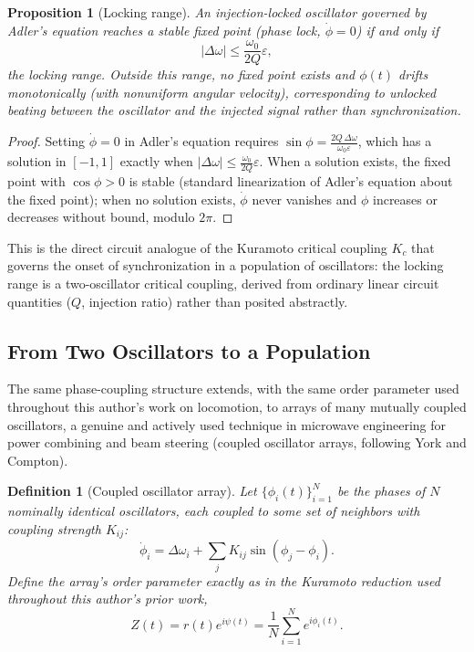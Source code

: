 \documentclass[12pt]{article}
\newtheorem{definition}{Definition}
\newtheorem{proposition}{Proposition}
\begin{document}
\begin{proposition}[Locking range]
An injection-locked oscillator governed by Adler's equation reaches a stable fixed point (phase lock, $\dot\phi = 0$) if and only if
\[
|\Delta\omega| \leq \frac{\omega_0}{2Q}\varepsilon,
\]
the locking range. Outside this range, no fixed point exists and $\phi(t)$ drifts monotonically (with nonuniform angular velocity), corresponding to unlocked beating between the oscillator and the injected signal rather than synchronization.
\end{proposition}

\begin{proof}
Setting $\dot\phi = 0$ in Adler's equation requires $\sin\phi = \frac{2Q\,\Delta\omega}{\omega_0 \varepsilon}$, which has a solution in $[-1,1]$ exactly when $|\Delta\omega| \leq \frac{\omega_0}{2Q}\varepsilon$. When a solution exists, the fixed point with $\cos\phi > 0$ is stable (standard linearization of Adler's equation about the fixed point); when no solution exists, $\dot\phi$ never vanishes and $\phi$ increases or decreases without bound, modulo $2\pi$.
\end{proof}

This is the direct circuit analogue of the Kuramoto critical coupling $K_c$ that governs the onset of synchronization in a population of oscillators: the locking range is a two-oscillator critical coupling, derived from ordinary linear circuit quantities ($Q$, injection ratio) rather than posited abstractly.

\subsection*{From Two Oscillators to a Population}

The same phase-coupling structure extends, with the same order parameter used throughout this author's work on locomotion, to arrays of many mutually coupled oscillators, a genuine and actively used technique in microwave engineering for power combining and beam steering (coupled oscillator arrays, following York and Compton).

\begin{definition}[Coupled oscillator array]
Let $\{\phi_i(t)\}_{i=1}^N$ be the phases of $N$ nominally identical oscillators, each coupled to some set of neighbors with coupling strength $K_{ij}$:
\[
\dot\phi_i = \Delta\omega_i + \sum_j K_{ij} \sin(\phi_j - \phi_i).
\]
Define the array's order parameter exactly as in the Kuramoto reduction used throughout this author's prior work,
\[
Z(t) = r(t)e^{i\psi(t)} = \frac{1}{N}\sum_{i=1}^N e^{i\phi_i(t)}.
\]
\end{definition}
\end{document}
